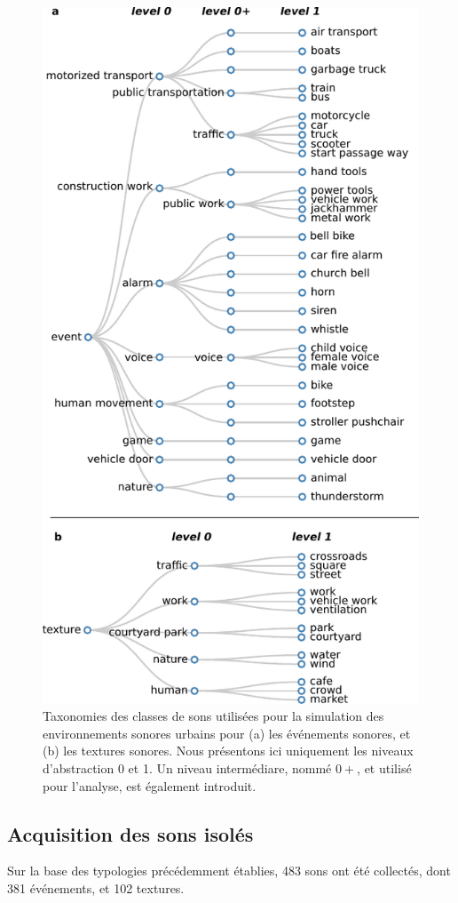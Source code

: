  
\begin{figure}[t]
        \myfloatalign
        \includegraphics[width=.5\linewidth]{gfx/ch_5/hierarchy/taxonomy}
       \caption[Taxonomies des classes de sons utilisées pour la simulation des environnements sonores urbains]{Taxonomies des classes de sons utilisées pour la simulation des environnements sonores urbains pour (a) les événements sonores, et (b) les textures sonores. Nous présentons ici uniquement les niveaux d'abstraction 0 et 1. Un niveau intermédiare, nommé $0+$, et utilisé pour l'analyse, est également introduit.}\label{fig:taxonomie}
\end{figure}

\subsection{Acquisition des sons isolés}
\label{sec:ch5_recordDataSet}

Sur la base des typologies précédemment établies, 483 sons ont été collectés, dont 381 événements, et 102 textures.

